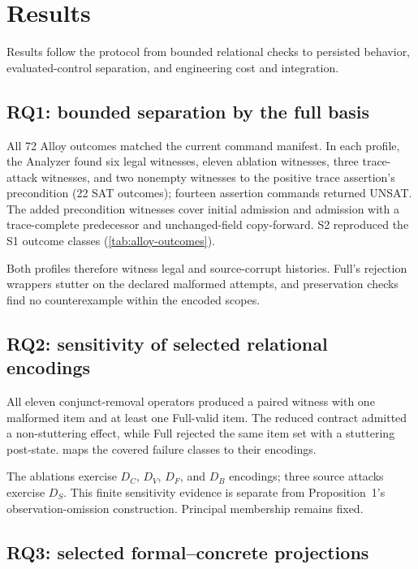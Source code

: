 \section{Results}
\label{sec:results}

Results follow the protocol from bounded relational checks to persisted behavior, evaluated-control separation, and engineering cost and integration.

\subsection{RQ1: bounded separation by the full basis}

All 72 Alloy outcomes matched the current command manifest. In each profile, the Analyzer found six legal witnesses, eleven ablation witnesses, three trace-attack witnesses, and two nonempty witnesses to the positive trace assertion's precondition (22 SAT outcomes); fourteen assertion commands returned UNSAT. The added precondition witnesses cover initial admission and admission with a trace-complete predecessor and unchanged-field copy-forward. S2 reproduced the S1 outcome classes (\cref{tab:alloy-outcomes}).

Both profiles therefore witness legal and source-corrupt histories. Full's rejection wrappers stutter on the declared malformed attempts, and preservation checks find no counterexample within the encoded scopes.

\subsection{RQ2: sensitivity of selected relational encodings}

All eleven conjunct-removal operators produced a paired witness with one malformed item and at least one Full-valid item. The reduced contract admitted a non-stuttering effect, while Full rejected the same item set with a stuttering post-state.  maps the covered failure classes to their encodings.

The ablations exercise $D_C$, $D_V$, $D_F$, and $D_B$ encodings; three source attacks exercise $D_S$. This finite sensitivity evidence is separate from Proposition~1's observation-omission construction. Principal membership remains fixed.

\subsection{RQ3: selected formal--concrete projections}

